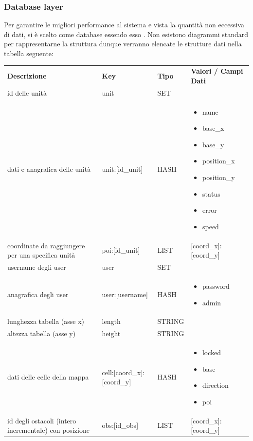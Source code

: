 	\subsubsection{Database layer}
		Per garantire le migliori performance al sistema e vista la quantità non eccessiva di dati, si è scelto  come database essendo esso . Non esistono diagrammi standard per rappresentarne la struttura dunque verranno elencate le strutture dati nella tabella seguente:
		
		\begin{table} [h!]
			\begin{center}
				\begin{tabular} { m{6cm} m{4cm} m{2cm} m{4cm}}
					\rowcolor{lightgray}
					\textbf{Descrizione} & \textbf{Key} & \textbf{Tipo} & \textbf{Valori / Campi Dati}\\
					id delle unità & unit & SET & \\
					dati e anagrafica delle unità & unit:[id\_unit] & HASH & 
						\begin{itemize}
							\item name
							\item base\_x
							\item base\_y
							\item position\_x
							\item position\_y
							\item status
							\item error
							\item speed
						\end{itemize}\\
					coordinate \glock{POI} da raggiungere per una specifica unità & poi:[id\_unit] & LIST & [coord\_x]:[coord\_y]\\
					username degli user & user & SET & \\
					anagrafica degli user & user:[username] & HASH & 
						\begin{itemize}
							\item password
							\item admin
						\end{itemize}\\
					lunghezza tabella (asse x) & length & STRING & \\
					altezza tabella (asse y) & height & STRING & \\
					dati delle celle della mappa & cell:[coord\_x]:[coord\_y] & HASH & 
						\begin{itemize}
							\item locked
							\item base
							\item direction
							\item poi
						\end{itemize}\\
					id degli ostacoli (intero incrementale) con posizione & obs:[id\_obs] & LIST & [coord\_x]:[coord\_y]\\
				\end{tabular}
			\end{center}
		\end{table}
	
